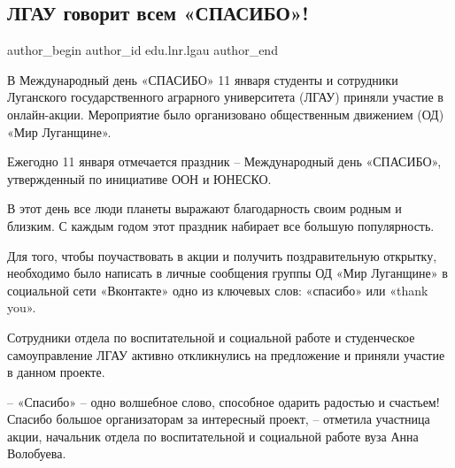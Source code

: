  
 
 
 
 
\subsection{ЛГАУ говорит всем «СПАСИБО»!}
\label{sec:11_01_2022.stz.edu.lnr.lgau.1.den_spasibo}

\ifcmt
 author_begin
   author_id edu.lnr.lgau
 author_end
\fi

\begin{zznagolos}
В Международный день «СПАСИБО» 11 января студенты и сотрудники Луганского
государственного аграрного университета (ЛГАУ) приняли участие в онлайн-акции.
Мероприятие было организовано общественным движением (ОД) «Мир Луганщине».	
\end{zznagolos}


Ежегодно 11 января отмечается праздник – Международный день «СПАСИБО»,
утвержденный по инициативе ООН и ЮНЕСКО.

В этот день все люди планеты выражают благодарность своим родным и близким. С
каждым годом этот праздник набирает все большую популярность.


Для того, чтобы поучаствовать в акции и получить поздравительную открытку,
необходимо было написать в личные сообщения группы ОД «Мир Луганщине» в
социальной сети «Вконтакте» одно из ключевых слов: «спасибо» или «thank you».

Сотрудники отдела по воспитательной и социальной работе и студенческое
самоуправление ЛГАУ активно откликнулись на предложение и приняли участие в
данном проекте.

\begin{zznagolos}
–  «Спасибо» – одно волшебное слово, способное одарить радостью и счастьем!
Спасибо большое организаторам за интересный проект, – отметила участница акции,
начальник отдела по воспитательной и социальной работе вуза Анна Волобуева.	
\end{zznagolos}


